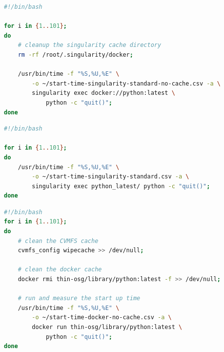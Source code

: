 \begin{lstlisting}[language=bash,
    caption={Script used to capture the startup time of Singularity running Docker standard images without Singularity cache}]
#!/bin/bash

for i in {1..101}; 
do
    # cleanup the singularity cache directory
    rm -rf /root/.singularity/docker; 
    
    /usr/bin/time -f "%S,%U,%E" \
        -o ~/start-time-singularity-standard-no-cache.csv -a \
        singularity exec docker://python:latest \
            python -c "quit()"; 
done
\end{lstlisting}



\begin{lstlisting}[language=bash,
    caption={Script used to capture the startup time of Singularity running images unpacked on the local file-system, hence with cache}]
#!/bin/bash

for i in {1..101}; 
do 
    /usr/bin/time -f "%S,%U,%E" \
        -o ~/start-time-singularity-standard.csv -a \
        singularity exec python_latest/ python -c "quit()"; 
done

\end{lstlisting}

\begin{lstlisting}[language=bash,caption={Script used to capture the startup time of docker thin-images without cache}]
#!/bin/bash
for i in {1..101}; 
do 
    # clean the CVMFS cache
    cvmfs_config wipecache >> /dev/null; 
        
    # clean the docker cache
    docker rmi thin-osg/library/python:latest -f >> /dev/null; 
        
    # run and measure the start up time
    /usr/bin/time -f "%S,%U,%E" \
        -o ~/start-time-docker-no-cache.csv -a \ 
        docker run thin-osg/library/python:latest \
            python -c "quit()"; 
done
\end{lstlisting}

